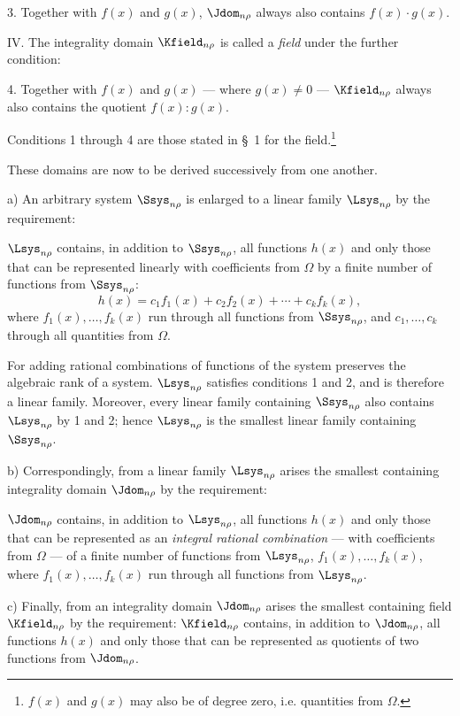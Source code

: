 \documentclass[11pt]{article}
\begin{document}
3. Together with $f(x)$ and $g(x)$, $\Jdom_{n\rho}$ always also contains $f(x)\cdot g(x)$.

IV. The integrality domain $\Kfield_{n\rho}$ is called a \emph{field} under the further condition:

4. Together with $f(x)$ and $g(x)$ --- where $g(x)\ne0$ --- $\Kfield_{n\rho}$ always also contains the quotient $f(x):g(x)$.

Conditions 1 through 4 are those stated in \S\ 1 for the field.\footnote{$f(x)$ and $g(x)$ may also be of degree zero, i.e. quantities from $\Omega$.}

These domains are now to be derived successively from one another.

a) An arbitrary system $\Ssys_{n\rho}$ is enlarged to a linear family $\Lsys_{n\rho}$ by the requirement:

$\Lsys_{n\rho}$ contains, in addition to $\Ssys_{n\rho}$, all functions $h(x)$ and only those that can be represented linearly with coefficients from $\Omega$ by a finite number of functions from $\Ssys_{n\rho}$:
\[
  h(x)=c_1f_1(x)+c_2f_2(x)+\cdots+c_kf_k(x),
\]
where $f_1(x),\ldots,f_k(x)$ run through all functions from $\Ssys_{n\rho}$, and $c_1,
\ldots,c_k$ through all quantities from $\Omega$.

For adding rational combinations of functions of the system preserves the algebraic rank of a system. $\Lsys_{n\rho}$ satisfies conditions 1 and 2, and is therefore a linear family. Moreover, every linear family containing $\Ssys_{n\rho}$ also contains $\Lsys_{n\rho}$ by 1 and 2; hence $\Lsys_{n\rho}$ is the smallest linear family containing $\Ssys_{n\rho}$.

b) Correspondingly, from a linear family $\Lsys_{n\rho}$ arises the smallest containing integrality domain $\Jdom_{n\rho}$ by the requirement:

$\Jdom_{n\rho}$ contains, in addition to $\Lsys_{n\rho}$, all functions $h(x)$ and only those that can be represented as an \emph{integral rational combination} --- with coefficients from $\Omega$ --- of a finite number of functions from $\Lsys_{n\rho}$, $f_1(x),\ldots,f_k(x)$, where $f_1(x),\ldots,f_k(x)$ run through all functions from $\Lsys_{n\rho}$.

c) Finally, from an integrality domain $\Jdom_{n\rho}$ arises the smallest containing field $\Kfield_{n\rho}$ by the requirement: $\Kfield_{n\rho}$ contains, in addition to $\Jdom_{n\rho}$, all functions $h(x)$ and only those that can be represented as quotients of two functions from $\Jdom_{n\rho}$.
\end{document}

